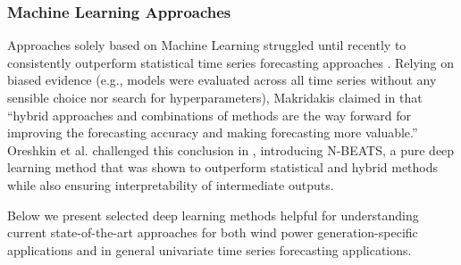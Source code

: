 \pagebreak
\subsubsection{Machine Learning Approaches}\label{subsubsec:ml_methods}

Approaches solely based on Machine Learning struggled until recently to consistently outperform statistical time series forecasting approaches \cite{makridakis2018m4}.
Relying on biased evidence (e.g., models were evaluated across all time series without any sensible choice nor search for hyperparameters), Makridakis claimed in \cite{makridakis2018m4} that ``hybrid approaches and combinations of methods are the way forward for improving the forecasting accuracy and making forecasting more valuable.''
Oreshkin et al. challenged this conclusion in \cite{oreshkin2019nbeats}, introducing N-BEATS, a pure deep learning method that was shown to outperform statistical and hybrid methods while also ensuring interpretability of intermediate outputs.

Below we present selected deep learning methods helpful for understanding current state-of-the-art approaches for both wind power generation-specific applications and in general univariate time series forecasting applications.

